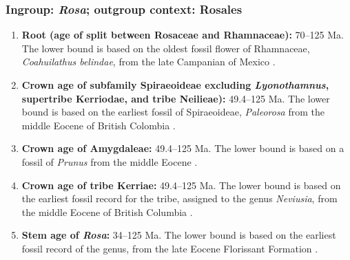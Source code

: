 
\subsubsection*{Ingroup: \textit{Rosa}; outgroup context: Rosales}


\begin{enumerate}
\item \textbf{Root (age of split between Rosaceae and Rhamnaceae):}
  70--125 Ma. The lower bound is based on the oldest fossil flower
  of Rhamnaceae, \textit{Coahuilathus belindae}, from the late
  Campanian of Mexico \citep{Calvillo-Canadell2007}.

\item \textbf{Crown age of subfamily Spiraeoideae excluding
    \textit{Lyonothamnus}, supertribe Kerriodae, and tribe Neilieae):}
  49.4--125 Ma. The lower bound is based on the earliest fossil of
  Spiraeoideae, \textit{Paleorosa} from the middle Eocene of British
  Colombia \citep{Basinger1976}.

\item \textbf{Crown age of Amygdaleae:} 49.4--125 Ma. The lower
  bound is based on a fossil of \textit{Prunus} from the middle Eocene
  \citep{DeVore2007}.

\item \textbf{Crown age of tribe Kerriae:} 49.4--125 Ma. The lower
  bound is based on the earliest fossil record for the tribe, assigned
  to the genus \textit{Neviusia}, from the middle Eocene of British
  Columbia \citep{DeVore2004}.

\item \textbf{Stem age of \textit{Rosa}:} 34--125 Ma. The lower bound
  is based on the earliest fossil record of the genus, from the late
  Eocene Florissant Formation \citep{Manchester2001}.
\end{enumerate}


